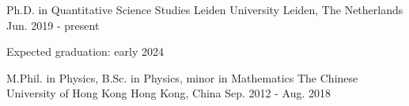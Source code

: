 

\begin{cventries}

  \cventry
    {Ph.D. in Quantitative Science Studies} %
    {Leiden University} %
    {Leiden, The Netherlands} %
    {Jun. 2019 - present} %
    {
      \begin{cvitems} %
        \item {Expected graduation: early 2024}
      \end{cvitems}
    }

  \cventry
    {M.Phil. in Physics, B.Sc. in Physics, minor in Mathematics} %
    {The Chinese University of Hong Kong} %
    {Hong Kong, China} %
    {Sep. 2012 - Aug. 2018} %
    {}


\end{cventries}
